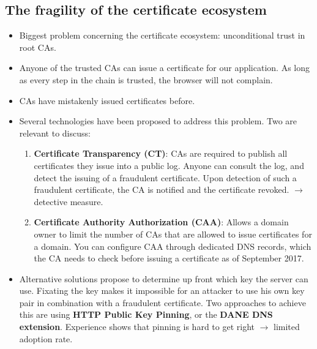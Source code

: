 \documentclass[../main.tex]{subfiles}
\begin{document}
\subsection{The fragility of the certificate ecosystem}
\begin{itemize}
\item Biggest problem concerning the certificate ecosystem: unconditional trust in root CAs.
\item Anyone of the trusted CAs can issue a certificate for our application. As long as every step in the chain is trusted, the browser will not complain.
\item CAs have mistakenly issued certificates before.
\item Several technologies have been proposed to address this problem. Two are relevant to discuss:
\begin{enumerate}
\item \textbf{Certificate Transparency (CT)}: CAs are required to publish all certificates they issue into a public log. Anyone can consult the log, and detect the issuing of a fraudulent certificate. Upon detection of such a fraudulent certificate, the CA is notified and the certificate revoked. $\rightarrow$ detective measure.
\item \textbf{Certificate Authority Authorization (CAA)}: Allows a domain owner to limit the number of CAs that are allowed to issue certificates for a domain. You can configure CAA through dedicated DNS records, which the CA needs to check before issuing a certificate as of September 2017.
\end{enumerate}
\item Alternative solutions propose to determine up front which key the server can use. Fixating the key makes it impossible for an attacker to use his own key pair in combination with a fraudulent certificate. Two approaches to achieve this are using \textbf{HTTP Public Key Pinning}, or the \textbf{DANE DNS extension}. Experience shows that pinning is hard to get right $\rightarrow$ limited adoption rate.
\end{itemize}
\end{document}
